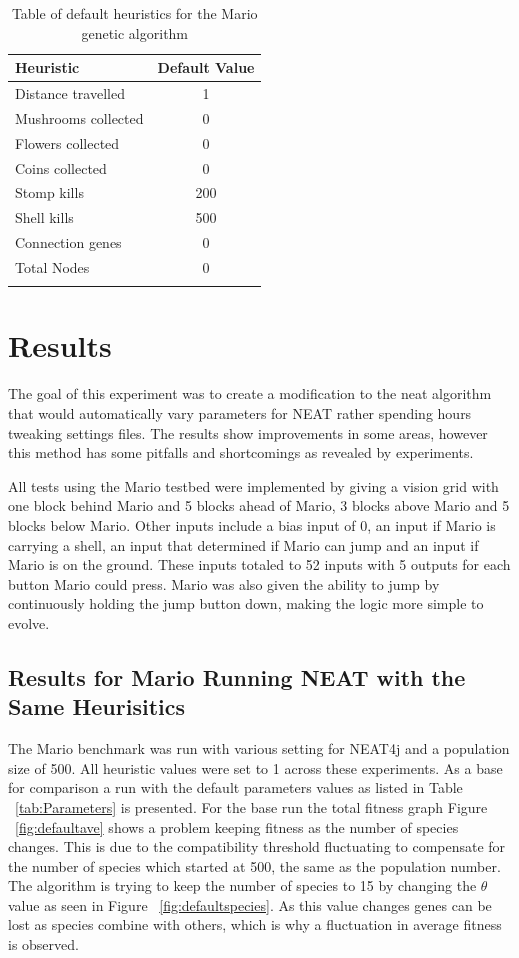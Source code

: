 \documentclass[12pt]{ucthesis} \newif\ifpdf \ifx\pdfoutput\undefined
\begin{document}
\begin{longtable}{| l | c |}
  \hline
  Heuristic & Default Value \\ \hline                   
  Distance travelled & 1  \\ \hline
  Mushrooms collected & 0 \\ \hline
  Flowers collected & 0  \\ \hline
  Coins collected & 0  \\ \hline
  Stomp kills & 200  \\ \hline
  Shell kills  & 500  \\ \hline
  Connection genes  & 0  \\ \hline
  Total Nodes  & 0  \\ \hline

\caption{Table of default heuristics for the Mario genetic
 algorithm}
\label{tab:Heuristics} 
\end{longtable}

\chapter{Results}
\label{chp:Results}

The goal of this experiment was to create a modification to the neat algorithm
that would automatically vary parameters for NEAT rather spending hours
tweaking settings files. The results show improvements in some areas, however
this method has some pitfalls and shortcomings as revealed by experiments.

All tests using the Mario testbed were implemented by giving a vision grid with
one block behind Mario and 5 blocks ahead of Mario, 3 blocks above Mario and 5
blocks below Mario. Other inputs include a bias input of 0, an input if Mario is
carrying a shell, an input that determined if Mario can jump and an input if
Mario is on the ground. These inputs totaled to 52 inputs with 5 outputs for each button Mario
could press. Mario was also given the ability to jump by continuously holding
the jump button down, making the logic more simple to evolve.

\section{Results for Mario Running NEAT with the Same Heurisitics}
The Mario benchmark was run with various setting for NEAT4j and a population
size of 500. All heuristic values were set to 1 across these experiments. As
a base for comparison a run with the default parameters values as listed in
Table ~\ref{tab:Parameters} is presented. For the base run the total fitness graph
Figure ~\ref{fig:defaultave} shows a problem keeping fitness as the number of species
changes. This is due to the compatibility threshold fluctuating to compensate
for the number of species which started at 500, the same as the population
number. The algorithm is trying to keep the number of species to 15 by
changing the $\theta$ value as seen in Figure ~\ref{fig:defaultspecies}. As this value
changes genes can be lost as species combine with others, which is why a
fluctuation in average fitness is observed.
\end{document}
